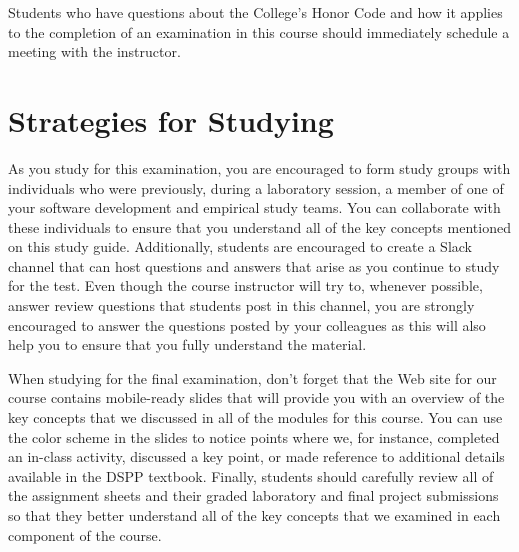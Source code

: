 \noindent Students who have questions about the College's Honor Code and how it applies to the completion of an
examination in this course should immediately schedule a meeting with the instructor.

\vspace*{-.2in}
\section*{Strategies for Studying}
\vspace*{-.1in}


As you study for this examination, you are encouraged to form study groups with individuals who were previously, during
a laboratory session, a member of one of your software development and empirical study teams. You can collaborate with
these individuals to ensure that you understand all of the key concepts mentioned on this study guide. Additionally,
students are encouraged to create a Slack channel that can host questions and answers that arise as you continue to
study for the test.  Even though the course instructor will try to, whenever possible, answer review questions that
students post in this channel, you are strongly encouraged to answer the questions posted by your colleagues as this
will also help you to ensure that you fully understand the material.

When studying for the final examination, don't forget that the Web site for our course contains mobile-ready slides that
will provide you with an overview of the key concepts that we discussed in all of the modules for this course. You can
use the color scheme in the slides to notice points where we, for instance, completed an in-class activity, discussed a
key point, or made reference to additional details available in the DSPP textbook. Finally, students should carefully
review all of the assignment sheets and their graded laboratory and final project submissions so that they better
understand all of the key concepts that we examined in each component of the course.


